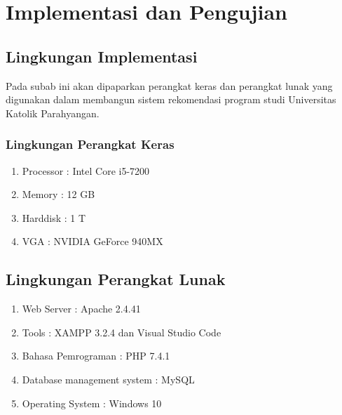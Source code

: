 \chapter{Implementasi dan Pengujian}
\label{chap:implementasi dan pengujian}

\section{Lingkungan Implementasi}
\label{sec:lingkungan implementasi}

Pada subab ini akan dipaparkan perangkat keras dan perangkat lunak yang digunakan dalam membangun sistem rekomendasi program studi Universitas Katolik Parahyangan.

\subsection{Lingkungan Perangkat Keras}
\label{sec:perangkat keras}

\begin{enumerate}
    \item Processor : Intel Core i5-7200
    
    \item Memory : 12 GB
    
    \item Harddisk : 1 T
    
    \item VGA : NVIDIA GeForce 940MX
\end{enumerate}

\section{Lingkungan Perangkat Lunak}
\label{sec:perangkat lunak}

\begin{enumerate}
    \item Web Server : Apache 2.4.41
    
    \item Tools : XAMPP 3.2.4 dan Visual Studio Code
    
    \item Bahasa Pemrograman : PHP 7.4.1
    
    \item Database management system : MySQL
    
    \item Operating System : Windows 10
\end{enumerate}

